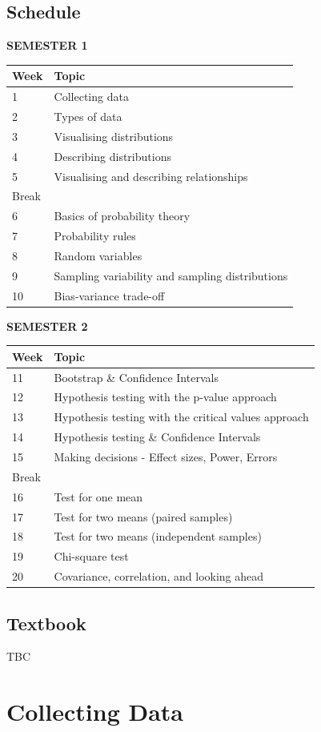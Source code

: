 \documentclass[12pt,]{krantz}
\begin{document}
\hypertarget{schedule}{%
\subsection*{Schedule}\label{schedule}}

\textbf{SEMESTER 1}

\begin{longtable}[]{@{}ll@{}}
\toprule
Week & Topic\tabularnewline
\midrule
\endhead
1 & Collecting data\tabularnewline
2 & Types of data\tabularnewline
3 & Visualising distributions\tabularnewline
4 & Describing distributions\tabularnewline
5 & Visualising and describing relationships\tabularnewline
Break &\tabularnewline
6 & Basics of probability theory\tabularnewline
7 & Probability rules\tabularnewline
8 & Random variables\tabularnewline
9 & Sampling variability and sampling distributions\tabularnewline
10 & Bias-variance trade-off\tabularnewline
\bottomrule
\end{longtable}

\textbf{SEMESTER 2}

\begin{longtable}[]{@{}ll@{}}
\toprule
Week & Topic\tabularnewline
\midrule
\endhead
11 & Bootstrap \& Confidence Intervals\tabularnewline
12 & Hypothesis testing with the p-value approach\tabularnewline
13 & Hypothesis testing with the critical values approach\tabularnewline
14 & Hypothesis testing \& Confidence Intervals\tabularnewline
15 & Making decisions - Effect sizes, Power, Errors\tabularnewline
Break &\tabularnewline
16 & Test for one mean\tabularnewline
17 & Test for two means (paired samples)\tabularnewline
18 & Test for two means (independent samples)\tabularnewline
19 & Chi-square test\tabularnewline
20 & Covariance, correlation, and looking ahead\tabularnewline
\bottomrule
\end{longtable}

\hypertarget{textbook}{%
\subsection*{Textbook}\label{textbook}}

TBC

\hypertarget{chap-collecting-data}{%
\section{Collecting Data}\label{chap-collecting-data}}
\end{document}
